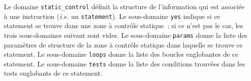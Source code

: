 \documentclass{article}
\begin{document}
{}

Le domaine {\tt static\_control} d\'efinit la structure de l'information qui 
est associ\'ee \`a une instruction ({\em i.e.} un {\tt statement}). Le 
sous-domaine {\tt yes} indique si ce statement se trouve dans une zone \`a 
contr\^ole statique~; si ce n'est pas le cas, les trois sous-domaines suivant 
sont vides. Le sous-domaine {\tt params} donne la liste des param\`etres de 
structure de la zone \`a contr\^ole statique dans laquelle se trouve ce 
statement. Le sous-domaine {\tt loops} donne la liste des boucles englobantes 
de ce statement. Le sous-domaine {\tt tests} donne la liste des conditions 
trouv\'ees dans les tests englobants de ce statement.
\end{document}
